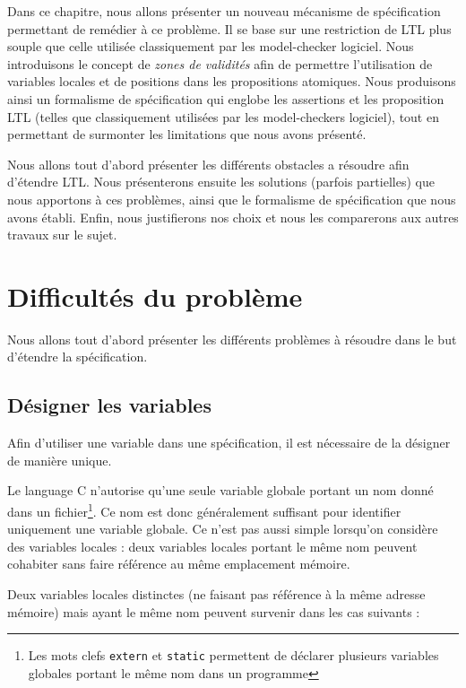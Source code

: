 Dans ce chapitre, nous allons présenter un nouveau mécanisme de spécification
permettant de remédier à ce problème. Il se base sur une restriction de \ac{LTL}
plus souple que celle utilisée classiquement par les model-checker logiciel.
Nous introduisons le concept de \emph{zones de validités} afin de permettre
l'utilisation de variables locales et de positions dans les propositions
atomiques. Nous produisons ainsi un formalisme de spécification qui englobe les
assertions et les proposition LTL (telles que classiquement utilisées par les
model-checkers logiciel), tout en permettant de surmonter les limitations que
nous avons présenté.

Nous allons tout d'abord présenter les différents obstacles a résoudre afin
d'étendre \ac{LTL}. Nous présenterons ensuite les solutions (parfois partielles)
que nous apportons à ces problèmes, ainsi que le formalisme de spécification que
nous avons établi. Enfin, nous justifierons nos choix et nous les comparerons
aux autres travaux sur le sujet.

\section{Difficultés du problème}

Nous allons tout d'abord présenter les différents problèmes à résoudre
dans le but d'étendre la spécification.

\subsection{Désigner les variables}

Afin d'utiliser une variable dans une spécification, il est nécessaire
de la désigner de manière unique.

Le language C n'autorise qu'une seule variable globale portant un nom
donné dans un fichier\footnote{Les mots clefs \texttt{extern} et
\texttt{static} permettent de déclarer plusieurs variables globales
portant le même nom dans un programme}. Ce nom est donc généralement
suffisant pour identifier uniquement une variable globale. Ce n'est pas
aussi simple lorsqu'on considère des variables locales : deux variables
locales portant le même nom peuvent cohabiter sans faire référence au
même emplacement mémoire.

Deux variables locales distinctes (ne faisant pas référence à la même
adresse mémoire) mais ayant le même nom peuvent survenir dans les cas
suivants :

